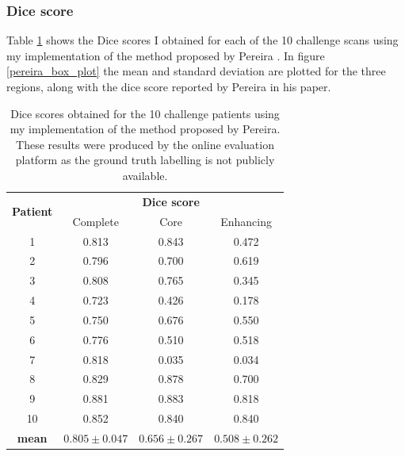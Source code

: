 \documentclass[12pt,a4paper,twoside,openright]{report}
\begin{document}
\subsubsection{Dice score}
Table \ref{table:pereira_dice_results} shows the Dice scores I obtained for each of the 10 challenge scans using my implementation of the method proposed by Pereira \cite{pereira}. In figure \ref{pereira_box_plot} the mean and standard deviation are plotted for the three regions, along with the dice score reported by Pereira in his paper. 
\begin{table}
\centering	
\begin{tabular}{ c | c c c} 
\multirow{2}{*}{\textbf{Patient}} & \multicolumn{3}{c}{\textbf{Dice score}} \\
 & Complete & Core & Enhancing \\
 \hline
1 & 0.813 & 0.843 & 0.472 \\
2 & 0.796 & 0.700 & 0.619 \\
3 & 0.808 & 0.765 & 0.345 \\
4 & 0.723 & 0.426 & 0.178 \\
5 & 0.750 & 0.676 & 0.550 \\
6 & 0.776 & 0.510 & 0.518 \\
7 & 0.818 & 0.035 & 0.034 \\
8 & 0.829 & 0.878 & 0.700 \\
9 & 0.881 & 0.883 & 0.818 \\
10 & 0.852 & 0.840 & 0.840 \\
\hline
\rule{0pt}{3ex}    
\textbf{mean} & $0.805 \pm 0.047$ & $0.656 \pm 0.267$ & $0.508 \pm 0.262$
\end{tabular}
\caption[Dice scores obtained for the 10 challenge patients using my implementation of the method proposed by Pereira.]{Dice scores obtained for the 10 challenge patients using my implementation of the method proposed by Pereira. These results were produced by the online evaluation platform as the ground truth labelling is not publicly available.}
\label{table:pereira_dice_results}
\end{table}
\end{document}
